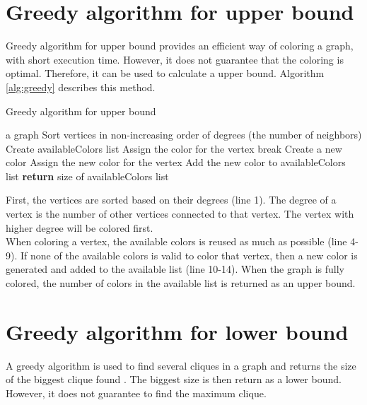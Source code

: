 \documentclass[a4paper]{report}
\begin{document}
		\section{Greedy algorithm for upper bound}
		Greedy algorithm for upper bound provides an efficient way of coloring a graph, with short execution time. However, it does not guarantee that the coloring is optimal. Therefore, it can be used to calculate a upper bound. Algorithm \ref{alg:greedy} \cite{jensen2011graph} describes this method.\\
		\begin{algorithm}
			\caption{Greedy algorithm for upper bound}
			\label{alg:greedy}
			\begin{algorithmic}[1]
				\REQUIRE a graph
				\STATE Sort vertices in non-increasing order of degrees (the number of neighbors)
				\STATE Create availableColors list
					\STATE Assign the color for the vertex
					\STATE break
					\ENDIF
					\ENDFOR
					\STATE Create a new color
					\STATE Assign the new color for the vertex
					\STATE Add the new color to availableColors list
					\ENDIF
				\ENDFOR
				\STATE \textbf{return} size of availableColors list
			\end{algorithmic}
		\end{algorithm}
		First, the vertices are sorted based on their degrees (line 1). The degree of a vertex is the number of other vertices connected to that vertex. The vertex with higher degree will be colored first.\\
		When coloring a vertex, the available colors is reused as much as possible (line 4-9). If none of the available colors is valid to color that vertex, then a new color is generated and added to the available list (line 10-14). When the graph is fully colored, the number of colors in the available list is returned as an upper bound.\\
		
		\section{Greedy algorithm for lower bound}
		A greedy algorithm is used to find several cliques in a graph and returns the size of the biggest clique found \cite{steven2008algorithm}. The biggest size is then return as a lower bound. However, it does not guarantee to find the maximum clique. \\
		
\end{document}
